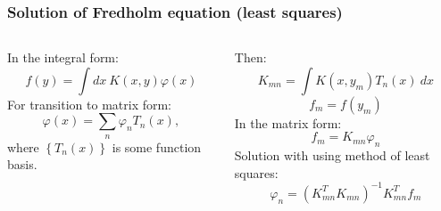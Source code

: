 \documentclass[8pt,pdf,hyperref={unicode}]{beamer}
\begin{document}
\begin{frame}
    \frametitle{Solution of Fredholm equation (least squares)}
    \begin{columns}[c]
        \begin{column}{0.45\textwidth}
            {\LARGE
                In the integral form:
                $$
                f(y) = \int dx~ K(x,y)\varphi(x)
                $$
                For transition to matrix form:
                $$
                \varphi(x) = \sum \limits_n \varphi_n T_n(x),
                $$
                where $\left\lbrace T_n(x)\right\rbrace $ is some function basis.

    }
\end{column}
        \vrule{}
         \hspace{5pt}
     \begin{column}{0.45\textwidth}
                {\LARGE
                Then:
                $$
                K_{mn} = \int K(x,y_m)T_n(x)~dx
                $$
                $$
                f_m = f(y_m)
                $$
                In the matrix form:
                $$
                f_m = K_{mn}\varphi_n
                $$
                Solution with using method of least squares:
                $$
                \varphi_n = (K_{mn}^{T}K_{mn})^{-1}K_{mn}^{T}f_m
                $$
                    
                }
            
\end{column}

    \end{columns}
    \end{frame}
\end{document}
